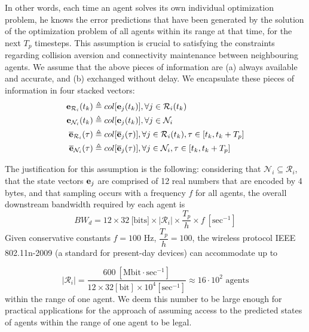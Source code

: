 In other words, each time an agent solves its own individual
optimization problem, he knows the error predictions that have been generated
by the solution of the optimization problem of all agents within
its range at that time, for the next $T_p$ timesteps. This assumption is
crucial to satisfying the constraints regarding collision aversion and
connectivity maintenance between neighbouring agents.
We assume that the above pieces of information are (a) always available and
accurate, and (b) exchanged without delay. We encapsulate these pieces of
information in four stacked vectors:
\begin{subequations}
\begin{align}
  \bm{\mathbf{e}}_{\mathcal{R}_i}(t_k) &\triangleq col[\bm{\mathbf{e}}_j(t_k)], \forall j \in \mathcal{R}_i(t_k) \\
  \bm{\mathbf{e}}_{\mathcal{N}_i}(t_k) &\triangleq col[\bm{\mathbf{e}}_j(t_k)], \forall j \in \mathcal{N}_i \\
  \overline{\bm{\mathbf{e}}}_{\mathcal{R}_i}(\tau) &\triangleq col[\overline{\bm{\mathbf{e}}}_j(\tau)], \forall j \in \mathcal{R}_i(t_k), \tau \in [t_k, t_k + T_p] \\
  \overline{\bm{\mathbf{e}}}_{\mathcal{N}_i}(\tau) &\triangleq col[\overline{\bm{\mathbf{e}}}_j(\tau)], \forall j \in \mathcal{N}_i, \tau \in [t_k, t_k + T_p]
\end{align}
\end{subequations}

\begin{bw_box}
\begin{remark}
The justification for this assumption is the following: considering that
$\mathcal{N}_i \subseteq \mathcal{R}_i$, that the state
vectors $\bm{\mathbf{e}}_j$ are comprised of 12 real numbers that are encoded by
4 bytes, and that sampling occurs with a frequency $f$ for all agents, the
overall downstream bandwidth required by each agent is
$$BW_d = 12 \times 32\ \text{[bits]} \times |\mathcal{R}_i| \times \dfrac{T_p}{h} \times f\ [\text{sec}^{-1}]$$
Given conservative constants $f = 100$ Hz, $\dfrac{T_p}{h} = 100$, the
wireless protocol IEEE 802.11n-2009 (a standard for present-day devices)
can accommodate up to

$$|\mathcal{R}_i| = \dfrac{600\ [\text{Mbit}\cdot \text{sec}^{-1}] }{12\times32[\text{bit}]\times10^4 [\text{sec}^{-1}]} \approx
16 \cdot 10^2 \text{ agents}$$ within the range of one agent.
We deem this number to be large enough for practical applications
for the approach of assuming access to the predicted states of agents
within the range of one agent to be legal.
\end{remark}
\end{bw_box}

